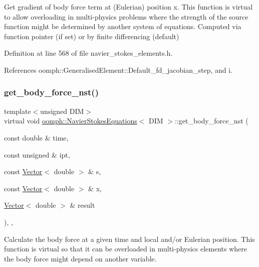 Get gradient of body force term at (Eulerian) position x. This function is virtual to allow overloading in multi-\/physics problems where the strength of the source function might be determined by another system of equations. Computed via function pointer (if set) or by finite differencing (default) 

Definition at line 568 of file navier\+\_\+stokes\+\_\+elements.\+h.



References oomph\+::\+Generalised\+Element\+::\+Default\+\_\+fd\+\_\+jacobian\+\_\+step, and i.

\mbox{\label{classoomph_1_1NavierStokesEquations_a8a3f44daab0e804f2d9b03ab9a962440}} 
\subsubsection{\texorpdfstring{get\+\_\+body\+\_\+force\+\_\+nst()}{get\_body\_force\_nst()}}
{\footnotesize\ttfamily template$<$unsigned D\+IM$>$ \\
virtual void \hyperlink{classoomph_1_1NavierStokesEquations}{oomph\+::\+Navier\+Stokes\+Equations}$<$ D\+IM $>$\+::get\+\_\+body\+\_\+force\+\_\+nst (\begin{DoxyParamCaption}\item[{const double \&}]{time,  }\item[{const unsigned \&}]{ipt,  }\item[{const \hyperlink{classoomph_1_1Vector}{Vector}$<$ double $>$ \&}]{s,  }\item[{const \hyperlink{classoomph_1_1Vector}{Vector}$<$ double $>$ \&}]{x,  }\item[{\hyperlink{classoomph_1_1Vector}{Vector}$<$ double $>$ \&}]{result }\end{DoxyParamCaption})\hspace{0.3cm}{\ttfamily [inline]}, {\ttfamily [protected]}, {\ttfamily [virtual]}}



Calculate the body force at a given time and local and/or Eulerian position. This function is virtual so that it can be overloaded in multi-\/physics elements where the body force might depend on another variable. 



